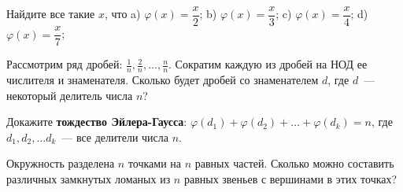 \documentclass{article}
\begin{document}
\begin{enumerate_boxed}
        \item Найдите все такие $x$, что a) $\varphi(x) = \dfrac{x}{2}$; b) $\varphi(x) = \dfrac{x}{3}$; c) $\varphi(x) = \dfrac{x}{4}$; d) $\varphi(x) = \dfrac{x}{7}$;

        \item Рассмотрим ряд дробей: $\frac{1}{n}, \frac{2}{n}, \ldots, \frac{n}{n}$.
        Сократим каждую из дробей на НОД ее числителя и знаменателя.
        Сколько будет дробей со знаменателем $d$, где $d$~--- некоторый делитель числа $n$?

        \item Докажите \textbf{тождество Эйлера-Гаусса}: $\varphi(d_1) + \varphi(d_2) + \ldots + \varphi(d_k) = n$, где $d_1, d_2, \ldots d_k$~--- все делители числа $n$.

        \item Окружность разделена $n$ точками на $n$ равных частей.
        Сколько можно составить различных замкнутых ломаных из $n$ равных звеньев с вершинами в этих точках?

    \end{enumerate_boxed}
\end{document}
